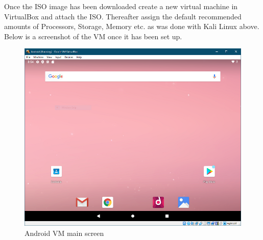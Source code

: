 \documentclass[a4paper, 12pt, titlepage]{report}
\begin{document}
Once the ISO image has been downloaded create a new virtual machine in VirtualBox and attach the ISO. Thereafter assign the default recommended amounts of Processors, Storage, Memory etc. as was done with Kali Linux above. Below is a screenshot of the VM once it has been set up.
\begin{figure}[H]
    \centering
    \includegraphics[scale=0.5]{pics/andro-proj2.PNG}
    \caption{Android VM main screen}
\end{figure}
\end{document}
